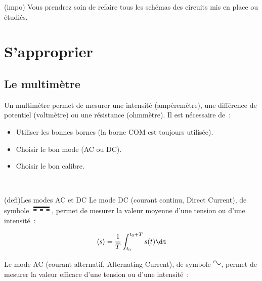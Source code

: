\documentclass[../main/main.tex]{subfiles}
\begin{document}
{	\begin{tcn}(impo){}
		Vous prendrez soin de refaire tous les schémas des circuits mis en place ou
		étudiés.
	\end{tcn}

	\vspace{-30pt}
	\section{S'approprier}
	\subsection{Le multimètre}

	Un multimètre permet de mesurer une intensité (ampèremètre), une différence de
	potentiel (voltmètre) ou une résistance (ohmmètre). Il est nécessaire de~:
	\begin{itemize}
		\item Utiliser les bonnes bornes (la borne COM est
		      toujours utilisée).
		\item Choisir le bon mode (AC ou DC).
		\item Choisir le bon calibre.
	\end{itemize}

	\noindent
	\begin{minipage}[t]{.75\linewidth}
		~
		\begin{tcb}(defi){Les modes AC et DC}
			Le mode DC (courant continu, Direct Current), de symbole
			\includegraphics[height=12pt]{dc}, permet de mesurer la valeur moyenne d'une
			tension ou d'une intensité~:

			\begin{equation*}
				\left\langle s \right\rangle = \frac{1}{T} \int_{t_0}^{t_0+T} s(t) \dt
			\end{equation*}

			Le mode AC (courant alternatif, Alternating Current), de symbole
			\includegraphics[height=12pt]{ac}, permet de mesurer la valeur efficace
			d'une tension ou d'une intensité~:


\end{tcb}
\end{minipage}}
\end{document}
